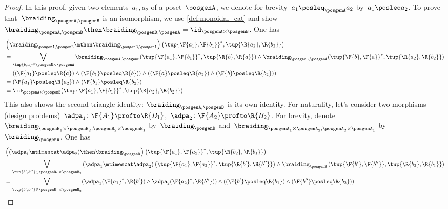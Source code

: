 \begin{proof}
    In this proof, given two elements~$a_1,a_2$ of a poset~$\posgenA$, we denote for brevity~$a_1 \posleq_\posgenA a_2$ by~$a_1 \posleq a_2$.
    To prove that~$\braiding_{\posgenA,\posgenB}$ is an isomorphism, we use \cref{def:monoidal_cat} and show~$\braiding_{\posgenA,\posgenB}\then \braiding_{\posgenB,\posgenA}=\id_{\posgenA\times \posgenB}$.
    One has
    \begin{equation}
        \begin{aligned}
            &\left( \braiding_{\posgenA,\posgenB}\mthen \braiding_{\posgenB,\posgenA}\right) \left( \tup{\F{a_1},\F{b_1}}^*,\tup{\R{a_2},\R{b_2}}\right)\\
            &=\bigvee_{\tup{b,a}\in \posgenB\times \posgenA}\braiding_{\posgenA,\posgenB}(\tup{\F{a_1},\F{b_1}}^*,\tup{\R{b},\R{a}})\wedge \braiding_{\posgenB,\posgenA}(\tup{\F{b},\F{a}}^*,\tup{\R{a_2},\R{b_2}})\\
            &=\left( (\F{a_1}\posleq \R{a}) \wedge (\F{b_1}\posleq \R{b})\right)\wedge \left((\F{a}\posleq \R{a_2}) \wedge (\F{b}\posleq \R{b_2})\right)\\
            &=(\F{a_1}\posleq \R{a_2})\wedge (\F{b_1}\posleq \R{b_2})\\
            &=\id_{\posgenA\times \posgenB}(\tup{\F{a_1},\F{b_1}}^*,\tup{\R{a_2},\R{b_2}}).
        \end{aligned}
    \end{equation}
    This also shows the second triangle identity: $\braiding_{\posgenA,\posgenB}$ is its own identity.
    For naturality, let's consider two morphisms (design problems)~$\adpa_1\colon \F{A_1}\profto \R{B_1}$,~$\adpa_2\colon \F{A_2}\profto \R{B_2}$.
    For brevity, denote~$\braiding_{\posgenB_1\times \posgenB_2,\posgenB_2\times \posgenB_1}$ by~$\braiding_\posgenB$ and~$\braiding_{\posgenA_1\times \posgenA_2,\posgenA_2\times \posgenA_1}$ by~$\braiding_\posgenA$.
    One has
    \begin{equation}
        \begin{aligned}
            &\left((\adpa_1\mtimescat \adpa_2)\then \braiding_\posgenB \right)\left( \tup{\F{a_1},\F{a_2}}^*,\tup{\R{b_2},\R{b_1}}\right)\\
            &=\bigvee_{\tup{b',b''}\in \posgenB_1\times \posgenB_2} \left(\adpa_1\mtimescat \adpa_2\right) \left( \tup{\F{a_1},\F{a_2}}^*,\tup{\R{b'},\R{b''}}\right)\wedge \braiding_\posgenB\left(\tup{\F{b'},\F{b''}},\tup{\R{b_2},\R{b_1}} \right)\\
            &=\bigvee_{\tup{b',b''}\in \posgenB_1\times \posgenB_2}(\adpa_1(\F{a_1}^*,\R{b'})\wedge \adpa_2(\F{a_2}^*,\R{b''}))\wedge (\left(\F{b'}\posleq \R{b_1}\right) \wedge \left(\F{b''}\posleq \R{b_2}\right))\\

\end{aligned}
\end{equation}
\end{proof}
